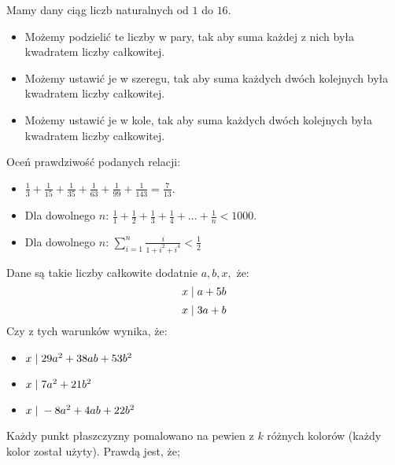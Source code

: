 \documentclass[12pt, a4paper]{article}
\newcommand{\question}[1]{\normalitem \begin{samepage}#1 \end{samepage}}
\newcommand{\questionwithasterix}[1]{ \asterixitem \begin{samepage}#1 \vspace{6cm}\end{samepage}}
\newcommand{\cmark}{\textcolor{green}{T}}%
\newcommand{\xmark}{\textcolor{red}{N}}%
\newcommand{\yes}{\rlap{\framebox(15,15)} {\raisebox{2pt}{\large\hspace{-1pt}\cmark}}%
\hspace{3pt}}
\newcommand{\no}{\rlap{\framebox(15,15)} {\raisebox{2pt}{\large\hspace{-1pt}\xmark}}%
\hspace{3pt}}
\begin{document}
\begin{enumerate}
	\question {
		Mamy dany ciąg liczb naturalnych od $1$ do $16$.

		\begin{itemize}
			\item [\yes]Możemy podzielić te liczby w pary, tak aby suma każdej z nich była kwadratem liczby całkowitej.
			\item [\yes]Możemy ustawić je w szeregu, tak aby suma każdych dwóch kolejnych była kwadratem liczby całkowitej.
			\item [\no]Możemy ustawić je w kole, tak aby suma każdych dwóch kolejnych była kwadratem liczby całkowitej.
		\end{itemize}
	}
	
	\questionwithasterix {
		Oceń prawdziwość podanych relacji:

		\begin{itemize}
			\item [\no]$\frac{1}{3} + \frac{1}{15} + \frac{1}{35} + \frac{1}{63} + \frac{1}{99} + \frac{1}{143} = \frac{7}{13}$.
			\item [\no]Dla dowolnego $n$: $\frac{1}{1} + \frac{1}{2} + \frac{1}{3} + \frac{1}{4} + \ldots + \frac{1}{n} < 1000$.
			\item [\yes] Dla dowolnego $n$: $\sum_{i=1}^n \frac{i}{1+i^2+i^4} < \frac{1}{2}$ 
		\end{itemize}
	}
	
	\question{
		Dane są takie liczby całkowite dodatnie $a, b, x,$ że:
        $$x \hspace{0.1cm} | \hspace{0.1cm} a+5b$$
        $$x \hspace{0.1cm} | \hspace{0.1cm} 3a+b $$
        Czy z tych warunków wynika, że:
        
		\begin{itemize}
			\item [\yes]$x \hspace{0.1cm} | \hspace{0.1cm} 29a^2+38ab+53b^2$
			\item [\yes]$x \hspace{0.1cm} | \hspace{0.1cm} 7a^2+21b^2$
			\item [\no]$x \hspace{0.1cm} | \hspace{0.1cm} -8a^2+4ab+22b^2$
		\end{itemize}
	}
	
	\questionwithasterix{
		Każdy punkt płaszczyzny pomalowano na pewien z $k$ różnych kolorów
        (każdy kolor został użyty). Prawdą jest, że;
        
}
\end{enumerate}
\end{document}
